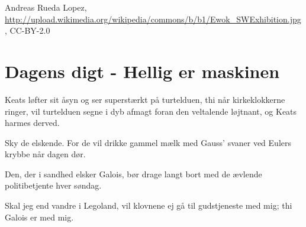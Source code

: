 \begin{minipage}[t]{100mm}
\begin{center}
\tiny Andreas Rueda Lopez, \url{http://upload.wikimedia.org/wikipedia/commons/b/b1/Ewok_SWExhibition.jpg}, CC-BY-2.0
\end{center}

\section*{Dagens digt - Hellig er maskinen}
\begin{center}
Keats løfter sit åsyn og ser superstærkt på turtelduen, thi når kirkeklokkerne ringer, vil turtelduen segne i dyb afmagt foran den veltalende løjtnant, og Keats harmes derved.

Sky de elskende. For de vil drikke gammel mælk med Gauss' svaner ved Eulers krybbe når dagen dør.

Den, der i sandhed elsker Galois, bør drage langt bort med de ævlende politibetjente hver søndag.

Skal jeg end vandre i Legoland, vil klovnene ej gå til gudstjeneste med mig; thi Galois er med mig.
\end{center}
\end{minipage}
